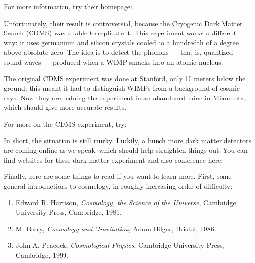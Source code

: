 \documentclass{article}
\def\tightlist{}
\renewcommand{\texttt}[1]{%
  \begingroup
  \ttfamily
  \begingroup\lccode`~=`/\lowercase{\endgroup\def~}{/\discretionary{}{}{}}%
  \begingroup\lccode`~=`[\lowercase{\endgroup\def~}{[\discretionary{}{}{}}%
  \begingroup\lccode`~=`.\lowercase{\endgroup\def~}{.\discretionary{}{}{}}%
  \catcode`/=\active\catcode`[=\active\catcode`.=\active
  \scantokens{#1\noexpand}%
  \endgroup
}
\begin{document}
For more information, try their homepage:


Unfortunately, their result is controversial, because the Cryogenic Dark
Matter Search (CDMS) was unable to replicate it. This experiment works a
different way: it uses germanium and silicon crystals cooled to a
hundredth of a degree above absolute zero. The idea is to detect the
phonons --- that is, quantized sound waves --- produced when a WIMP
smacks into an atomic nucleus.

The original CDMS experiment was done at Stanford, only 10 meters below
the ground; this meant it had to distinguish WIMPs from a background of
cosmic rays. Now they are redoing the experiment in an abandoned mine in
Minnesota, which should give more accurate results.

For more on the CDMS experiment, try:


In short, the situation is still murky. Luckily, a bunch more dark
matter detectors are coming online as we speak, which should help
straighten things out. You can find websites for these dark matter
experiment and also conference here:


Finally, here are some things to read if you want to learn more. First,
some general introductions to cosmology, in roughly increasing order of
difficulty:

\begin{enumerate}
\def\labelenumi{\arabic{enumi})}
\setcounter{enumi}{6}
\item
  Edward R. Harrison, \emph{Cosmology, the Science of the Universe},
  Cambridge University Press, Cambridge, 1981.
\item
  M. Berry, \emph{Cosmology and Gravitation}, Adam Hilger, Bristol,
  1986.
\item
  John A. Peacock, \emph{Cosmological Physics}, Cambridge University
  Press, Cambridge, 1999.
\end{enumerate}
\end{document}
